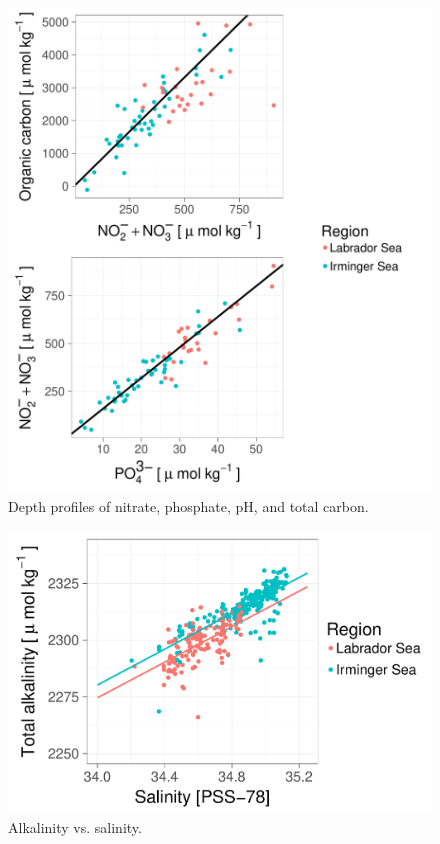 \documentclass[journal, a4paper]{article} %
\begin{document}
\begin{figure}[htbp]
	\begin{center}
		\includegraphics[scale=0.4]{Redfield_comparison.pdf} %
	\end{center}
	\caption[Field photo of the hydrophone array]{
	\label{f:redfield}
	Depth profiles of nitrate, phosphate, pH, and total carbon.}
\end{figure}

\begin{figure}[htbp]
	\begin{center}
		\includegraphics[scale=0.4]{alk_sal.pdf} %
	\end{center}
	\caption[Field photo of the hydrophone array]{
	\label{f:array}
	Alkalinity vs. salinity. }
\end{figure}
\end{document}
